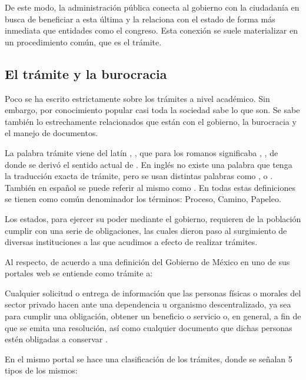 De este modo, la administración pública conecta al gobierno con la ciudadanía en
busca de beneficiar a esta última y la relaciona con el estado de forma más inmediata que entidades como el congreso.
Esta conexión se suele materializar en un procedimiento común, que es el
trámite.

\subsection{El trámite y la burocracia}

Poco se ha escrito estrictamente sobre los trámites a nivel académico. Sin
embargo, por conocimiento popular casi toda la sociedad sabe lo que son. Se sabe
también lo estrechamente relacionados que están con el gobierno, la burocracia y
el manejo de documentos.

La palabra trámite viene del latín ,
, que para los romanos significaba ,
, de donde se derivó el sentido actual de . En inglés no existe una palabra que
tenga la traducción exacta de trámite, pero se usan distintas palabras como 
,  o .
También en español se puede referir al mismo como . En todas estas definiciones se tienen como común denominador
los términos: Proceso, Camino, Papeleo.

Los estados, para ejercer su poder mediante el gobierno, requieren de la
población cumplir con una serie de obligaciones, las cuales dieron paso al
surgimiento de diversas instituciones a las que acudimos a efecto de realizar
trámites.

Al respecto, de acuerdo a una definición del Gobierno de México en uno de sus
portales web se entiende como trámite a:

\begin{displayquote}
 Cualquier solicitud o entrega de información que las
personas físicas o morales del sector privado hacen ante una dependencia u
organismo descentralizado, ya sea para cumplir una obligación, obtener un
beneficio o servicio o, en general, a fin de que se emita una resolución, así
como cualquier documento que dichas personas estén obligadas a conservar
\cite{portalmexicotramite}.
\end{displayquote}

En el mismo portal se hace una clasificación de los trámites, donde se señalan 5
tipos de los mismos:

